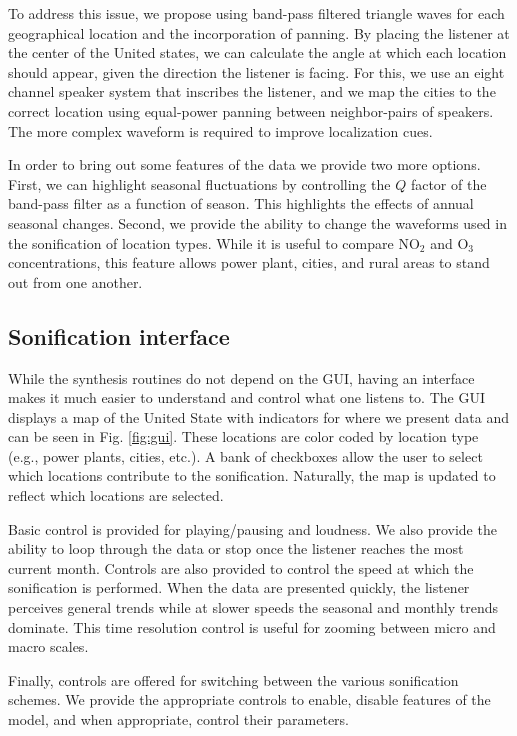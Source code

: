 \documentclass[a4paper,10pt,oneside]{article}
\newcommand{\ce}[1]{$\mathrm{#1}$}
\begin{document}
\begin{sloppy}
To address this issue, we propose using band-pass filtered triangle waves for each geographical location and the incorporation of panning. By placing the listener at the center of the United states, we can calculate the angle at which each location should appear, given the direction the listener is facing.  For this, we use an eight channel speaker system that inscribes the listener, and we map the cities to the correct location using equal-power panning between neighbor-pairs of speakers.  The more complex waveform is required to improve localization cues.  

In order to bring out some features of the data we provide two more options. First, we can highlight seasonal fluctuations by controlling the $Q$ factor of the band-pass filter as a function of season. This highlights the effects of annual seasonal changes. Second, we provide the ability to change the waveforms used in the sonification of location types. While it is useful to compare \ce{NO_2} and \ce{O_3} concentrations, this feature allows power plant, cities, and rural areas to stand out from one another. 


\subsection{Sonification interface}

While the synthesis routines do not depend on the GUI, having an interface makes it much easier to understand and control what one listens to. The GUI displays a map of the United State with indicators for where we present data and can be seen in Fig. \ref{fig:gui}.  These locations are color coded by location type (e.g., power plants, cities, etc.). A bank of checkboxes allow the user to select which locations contribute to the sonification. Naturally, the map is updated to reflect which locations are selected.  


Basic control is provided for playing/pausing and loudness. We also provide the ability to loop through the data or stop once the listener reaches the most current month.  Controls are also provided to control the speed at which the sonification is performed.  When the data are presented quickly, the listener perceives general trends while at slower speeds the seasonal and monthly trends dominate.  This time resolution control is useful for zooming between micro and macro scales.  

Finally, controls are offered for switching between the various sonification schemes. We provide the appropriate controls to enable, disable features of the model, and when appropriate, control their parameters.  


\end{sloppy}
\end{document}
